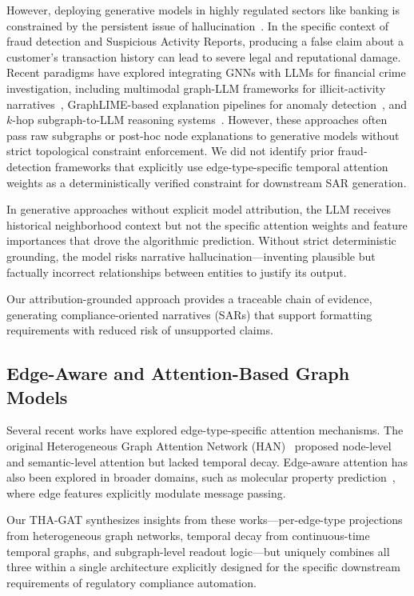 \documentclass[journal]{IEEEtran}
\begin{document}
However, deploying generative models in highly regulated sectors like banking is constrained by the persistent issue of hallucination~\cite{ji2023hallucination}. In the specific context of fraud detection and Suspicious Activity Reports, producing a false claim about a customer's transaction history can lead to severe legal and reputational damage. Recent paradigms have explored integrating GNNs with LLMs for financial crime investigation, including multimodal graph-LLM frameworks for illicit-activity narratives~\cite{multimodal2023}, GraphLIME-based explanation pipelines for anomaly detection~\cite{graphlime2023}, and $k$-hop subgraph-to-LLM reasoning systems~\cite{khop2023}. However, these approaches often pass raw subgraphs or post-hoc node explanations to generative models without strict topological constraint enforcement. We did not identify prior fraud-detection frameworks that explicitly use edge-type-specific temporal attention weights as a deterministically verified constraint for downstream SAR generation.

In generative approaches without explicit model attribution, the LLM receives historical neighborhood context but not the specific attention weights and feature importances that drove the algorithmic prediction. Without strict deterministic grounding, the model risks narrative hallucination---inventing plausible but factually incorrect relationships between entities to justify its output.

Our attribution-grounded approach provides a traceable chain of evidence, generating compliance-oriented narratives (SARs) that support formatting requirements with reduced risk of unsupported claims.

\subsection{Edge-Aware and Attention-Based Graph Models}

Several recent works have explored edge-type-specific attention mechanisms. The original Heterogeneous Graph Attention Network (HAN)~\cite{wang2019han} proposed node-level and semantic-level attention but lacked temporal decay. Edge-aware attention has also been explored in broader domains, such as molecular property prediction~\cite{yang2019analyzing}, where edge features explicitly modulate message passing.

Our THA-GAT synthesizes insights from these works---per-edge-type projections from heterogeneous graph networks, temporal decay from continuous-time temporal graphs, and subgraph-level readout logic---but uniquely combines all three within a single architecture explicitly designed for the specific downstream requirements of regulatory compliance automation.
\end{document}
